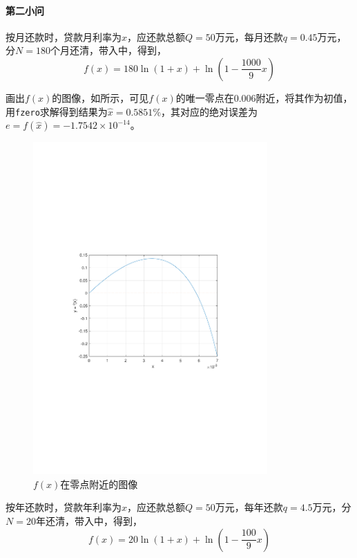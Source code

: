 \documentclass[12pt,a4paper]{article}
\begin{document}
\paragraph{第二小问} 按月还款时，贷款月利率为$x$，应还款总额$Q=50$万元，每月还款$q=0.45$万元，分$N=180$个月还清，带入中，得到，
\begin{equation}
    f(x) = 180 \ln (1+x) + \ln \left(1-\frac{1000}{9}x\right)
\end{equation}

画出$f(x)$的图像，如所示，可见$f(x)$的唯一零点在0.006附近，将其作为初值，用\texttt{fzero}求解得到结果为$\hat{x}=0.5851\%$，其对应的绝对误差为$e=f(\hat{x})=-1.7542\times 10^{-14}$。

\begin{figure}[t]
    \centering
    \includegraphics[width=0.8\textwidth,trim={3.09cm 9.295cm 3.09cm 9.295cm},clip]{fig/ex3_2_graph.pdf}
    \caption{$f(x)$在零点附近的图像}
    \label{fig:ex3_2_graph}
\end{figure}

按年还款时，贷款年利率为$x$，应还款总额$Q=50$万元，每年还款$q=4.5$万元，分$N=20$年还清，带入中，得到，
\begin{equation}
    f(x) = 20 \ln (1+x) + \ln \left(1-\frac{100}{9}x\right)
\end{equation}
\end{document}
